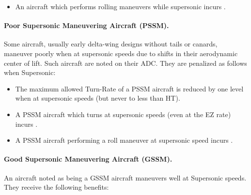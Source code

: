 \begin{advancedrules}
\begin{itemize}
    \item An aircraft which performs rolling maneuvers while supersonic incurs .

\end{itemize}


\paragraph{Poor Supersonic Maneuvering Aircraft (PSSM).} Some aircraft, usually early delta-wing designs without tails or canards, maneuver poorly when at supersonic speeds due to shifts in their aerodynamic center of lift.  Such aircraft are noted on their ADC. They are penalized as follows when Supersonic:

\begin{itemize}

    \item 
    The maximum allowed Turn-Rate of a PSSM aircraft is reduced by one level when at supersonic speeds (but never to less than HT).

    \item 
    A PSSM aircraft which turns at supersonic speeds (even at the EZ rate) incurs .

    \item 
    A PSSM aircraft performing a roll maneuver at supersonic speed incurs .

\end{itemize}

\paragraph{Good Supersonic Maneuvering Aircraft (GSSM).} An aircraft noted as being a GSSM aircraft maneuvers well at Supersonic speeds. They receive the following benefits:


\end{advancedrules}

